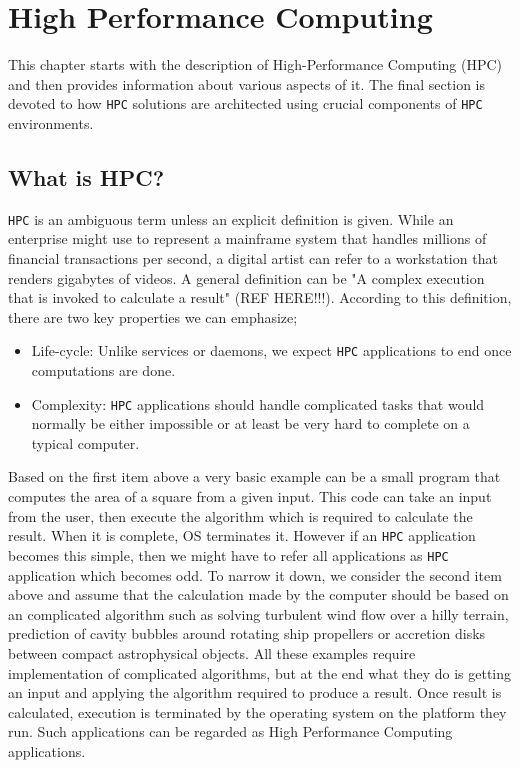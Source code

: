 \chapter{High Performance Computing} \label{chap-hpc}
This chapter starts with the description of High-Performance Computing (HPC) and then 
provides information about various aspects of it. The final section is devoted to how 
\texttt{HPC} solutions are architected using crucial components of \texttt{HPC} environments.

\section{What is HPC?}
\texttt{HPC} is an ambiguous term unless an explicit definition is given. While an enterprise 
might use to represent a mainframe system that handles millions of financial transactions per 
second, a digital artist can refer to a workstation that renders gigabytes of videos. 
A general definition can be "A complex execution that is invoked to calculate a result" 
(REF HERE!!!). According to this definition, there are two key properties we can emphasize; 
\begin{itemize}
  \item Life-cycle: Unlike services or daemons, we expect \texttt{HPC} applications to end once 
computations are done.
  \item Complexity: \texttt{HPC} applications should handle complicated tasks that would normally 
be either impossible or at least be very hard to complete on a typical computer.
\end{itemize}
Based on the first item above a very basic example can be a small program that computes 
the area of a square from a given input. This code can take an input from the user, then 
execute the algorithm which is required to calculate the result. When it is complete, OS 
terminates it. 
\newline \newline
However if an \texttt{HPC} application becomes this simple, then we might have to refer all 
applications as \texttt{HPC} application which becomes odd. To narrow it down, we consider the 
second item above and assume that the calculation made by the computer should be based 
on an complicated algorithm such as solving turbulent wind flow over a hilly terrain, 
prediction of cavity bubbles around rotating ship propellers or accretion disks between 
compact astrophysical objects. 
\newline \newline
All these examples require implementation of complicated algorithms, but at the end what 
they do is getting an input and applying the algorithm required to produce a result. 
Once result is calculated, execution is terminated by the operating system on the platform 
they run. Such applications can be regarded as High Performance Computing applications.  

